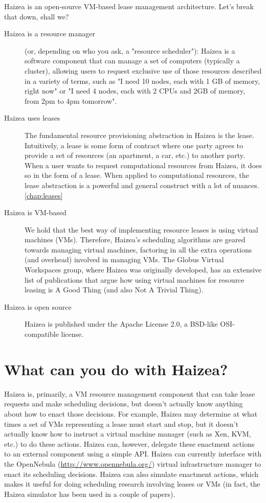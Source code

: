 Haizea is an open-source VM-based lease management architecture. Let's break that down, shall we?

\begin{description}
\item[Haizea is a resource manager] (or, depending on who you ask, a "resource scheduler"): Haizea is a software component that can manage a set of computers (typically a cluster), allowing users to request exclusive use of those resources described in a variety of terms, such as "I need 10 nodes, each with 1 GB of memory, right now" or "I need 4 nodes, each with 2 CPUs and 2GB of memory, from 2pm to 4pm tomorrow".
\item[Haizea uses leases] The fundamental resource provisioning abstraction in Haizea is the lease. Intuitively, a lease is some form of contract where one party agrees to provide a set of resources (an apartment, a car, etc.) to another party. When a user wants to request computational resources from Haizea, it does so in the form of a lease. When applied to computational resources, the lease abstraction is a powerful and general construct with a lot of nuances. \ref{chap:leases}
\item[Haizea is VM-based] We hold that the best way of implementing resource leases is using virtual machines (VMs). Therefore, Haizea's scheduling algorithms are geared towards managing virtual machines, factoring in all the extra operations (and overhead) involved in managing VMs. The Globus Virtual Workspaces group, where Haizea was originally developed, has an extensive list of publications that argue how using virtual machines for resource leasing is \textsf{A Good Thing} (and also \textsf{Not A Trivial Thing}).
\item[Haizea is open source] Haizea is published under the Apache License 2.0, a BSD-like OSI-compatible license.
\end{description}

\section{What can you do with Haizea?}

Haizea is, primarily, a VM resource management component that can take lease requests and make scheduling decisions, but doesn't actually know anything about how to enact those decisions. For example, Haizea may determine at what times a set of VMs representing a lease must start and stop, but it doesn't actually know how to instruct a virtual machine manager (such as Xen, KVM, etc.) to do these actions. Haizea can, however, delegate these enactment actions to an external component using a simple API. Haizea can currently interface with the OpenNebula (\url{http://www.opennebula.org/}) virtual infrastructure manager to enact its scheduling decisions. Haizea can also simulate enactment actions, which makes it useful for doing scheduling research involving leases or VMs (in fact, the Haizea simulator has been used in a couple of papers).

